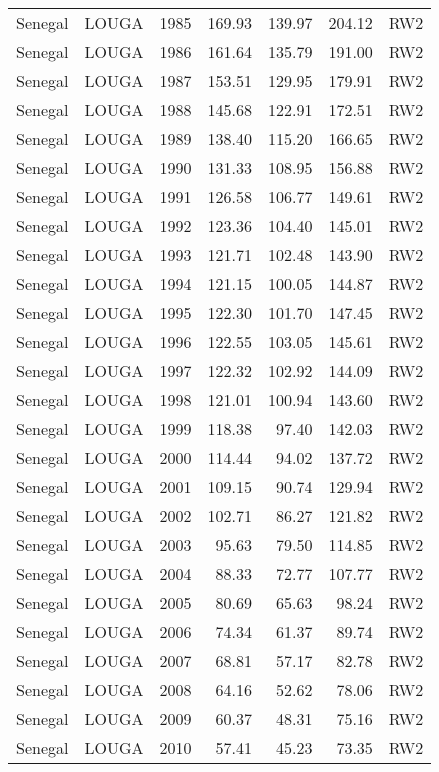 \begin{longtable}{lllrrrl}
  Senegal & LOUGA & 1985 & 169.93 & 139.97 & 204.12 & RW2 \\ 
  Senegal & LOUGA & 1986 & 161.64 & 135.79 & 191.00 & RW2 \\ 
  Senegal & LOUGA & 1987 & 153.51 & 129.95 & 179.91 & RW2 \\ 
  Senegal & LOUGA & 1988 & 145.68 & 122.91 & 172.51 & RW2 \\ 
  Senegal & LOUGA & 1989 & 138.40 & 115.20 & 166.65 & RW2 \\ 
  Senegal & LOUGA & 1990 & 131.33 & 108.95 & 156.88 & RW2 \\ 
  Senegal & LOUGA & 1991 & 126.58 & 106.77 & 149.61 & RW2 \\ 
  Senegal & LOUGA & 1992 & 123.36 & 104.40 & 145.01 & RW2 \\ 
  Senegal & LOUGA & 1993 & 121.71 & 102.48 & 143.90 & RW2 \\ 
  Senegal & LOUGA & 1994 & 121.15 & 100.05 & 144.87 & RW2 \\ 
  Senegal & LOUGA & 1995 & 122.30 & 101.70 & 147.45 & RW2 \\ 
  Senegal & LOUGA & 1996 & 122.55 & 103.05 & 145.61 & RW2 \\ 
  Senegal & LOUGA & 1997 & 122.32 & 102.92 & 144.09 & RW2 \\ 
  Senegal & LOUGA & 1998 & 121.01 & 100.94 & 143.60 & RW2 \\ 
  Senegal & LOUGA & 1999 & 118.38 & 97.40 & 142.03 & RW2 \\ 
  Senegal & LOUGA & 2000 & 114.44 & 94.02 & 137.72 & RW2 \\ 
  Senegal & LOUGA & 2001 & 109.15 & 90.74 & 129.94 & RW2 \\ 
  Senegal & LOUGA & 2002 & 102.71 & 86.27 & 121.82 & RW2 \\ 
  Senegal & LOUGA & 2003 & 95.63 & 79.50 & 114.85 & RW2 \\ 
  Senegal & LOUGA & 2004 & 88.33 & 72.77 & 107.77 & RW2 \\ 
  Senegal & LOUGA & 2005 & 80.69 & 65.63 & 98.24 & RW2 \\ 
  Senegal & LOUGA & 2006 & 74.34 & 61.37 & 89.74 & RW2 \\ 
  Senegal & LOUGA & 2007 & 68.81 & 57.17 & 82.78 & RW2 \\ 
  Senegal & LOUGA & 2008 & 64.16 & 52.62 & 78.06 & RW2 \\ 
  Senegal & LOUGA & 2009 & 60.37 & 48.31 & 75.16 & RW2 \\ 
  Senegal & LOUGA & 2010 & 57.41 & 45.23 & 73.35 & RW2 \\ 

\end{longtable}
